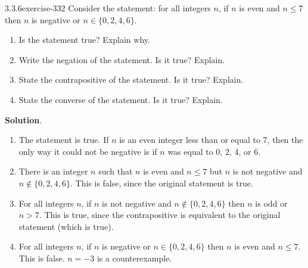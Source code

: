 \documentclass[twoside,11pt,]{book}
\numberwithin{equation}{chapter}
\begin{document}
\begin{divisionsolution}{3.3.6}{}{exercise-332}%
\hypertarget{p-4266}{}%
Consider the statement: for all integers \(n\), if \(n\) is even and \(n \le 7\) then \(n\) is negative or \(n \in \{0,2,4,6\}\).\leavevmode%
\begin{enumerate}[label=(\alph*)]
\item\hypertarget{li-2168}{}\hypertarget{p-4267}{}%
Is the statement true? Explain why.%
\item\hypertarget{li-2169}{}\hypertarget{p-4268}{}%
Write the negation of the statement. Is it true? Explain.%
\item\hypertarget{li-2170}{}\hypertarget{p-4269}{}%
State the contrapositive of the statement. Is it true? Explain.%
\item\hypertarget{li-2171}{}\hypertarget{p-4270}{}%
State the converse of the statement. Is it true? Explain.%
\end{enumerate}
%
\par\smallskip%
\noindent\textbf{Solution}.\quad%
\hypertarget{p-4271}{}%
\leavevmode%
\begin{enumerate}[label=(\alph*)]
\item\hypertarget{li-2172}{}\hypertarget{p-4272}{}%
The statement is true. If \(n\) is an even integer less than or equal to 7, then the only way it could not be negative is if \(n\) was equal to 0, 2, 4, or 6.%
\item\hypertarget{li-2173}{}\hypertarget{p-4273}{}%
There is an integer \(n\) such that \(n\) is even and \(n \le 7\) but \(n\) is not negative and \(n \not\in \{0,2,4,6\}\). This is false, since the original statement is true.%
\item\hypertarget{li-2174}{}\hypertarget{p-4274}{}%
For all integers \(n\), if \(n\) is not negative and \(n \not\in\{0,2,4,6\}\) then \(n\) is odd or \(n > 7\). This is true, since the contrapositive is equivalent to the original statement (which is true).%
\item\hypertarget{li-2175}{}\hypertarget{p-4275}{}%
For all integers \(n\), if \(n\) is negative or \(n \in \{0,2,4,6\}\) then \(n\) is even and \(n \le 7\). This is false. \(n = -3\) is a counterexample.%
\end{enumerate}
%
\end{divisionsolution}%
\end{document}
